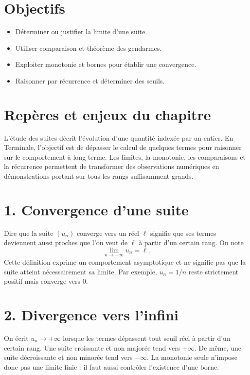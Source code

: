 
\section{Objectifs}
\begin{itemize}
\item Déterminer ou justifier la limite d’une suite.
\item Utiliser comparaison et théorème des gendarmes.
\item Exploiter monotonie et bornes pour établir une convergence.
\item Raisonner par récurrence et déterminer des seuils.
\end{itemize}

\section{Repères et enjeux du chapitre}
L'étude des suites décrit l'évolution d'une quantité indexée par un entier. En Terminale, l'objectif est de dépasser le calcul de quelques termes pour raisonner sur le comportement à long terme. Les limites, la monotonie, les comparaisons et la récurrence permettent de transformer des observations numériques en démonstrations portant sur tous les rangs suffisamment grands.

\section{1. Convergence d’une suite}
Dire que la suite $(u_n)$ converge vers un réel $\ell$ signifie que ses termes deviennent aussi proches que l'on veut de $\ell$ à partir d'un certain rang. On note
\[
\lim_{n\to+\infty}u_n=\ell.
\]
Cette définition exprime un comportement asymptotique et ne signifie pas que la suite atteint nécessairement sa limite. Par exemple, $u_n=1/n$ reste strictement positif mais converge vers $0$.

\section{2. Divergence vers l’infini}
On écrit $u_n\to+\infty$ lorsque les termes dépassent tout seuil réel à partir d'un certain rang. Une suite croissante et non majorée tend vers $+\infty$. De même, une suite décroissante et non minorée tend vers $-\infty$. La monotonie seule n'impose donc pas une limite finie : il faut aussi contrôler l'existence d'une borne.

